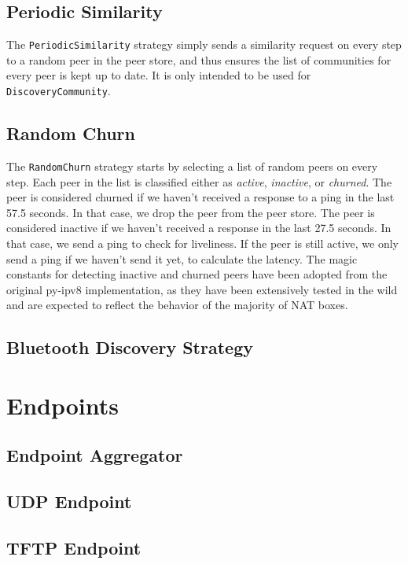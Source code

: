\subsection{Periodic Similarity}

The \texttt{PeriodicSimilarity} strategy simply sends a similarity request on every step to a random peer in the peer store, and thus ensures the list of communities for every peer is kept up to date. It is only intended to be used for \texttt{DiscoveryCommunity}.

\subsection{Random Churn}

The \texttt{RandomChurn} strategy starts by selecting a list of random peers on every step. Each peer in the list is classified either as \textit{active}, \textit{inactive}, or \textit{churned}. The peer is considered churned if we haven't received a response to a ping in the last 57.5 seconds. In that case, we drop the peer from the peer store. The peer is considered inactive if we haven't received a response in the last 27.5 seconds. In that case, we send a ping to check for liveliness. If the peer is still active, we only send a ping if we haven't send it yet, to calculate the latency. The magic constants for detecting inactive and churned peers have been adopted from the original py-ipv8 implementation, as they have been extensively tested in the wild and are expected to reflect the behavior of the majority of NAT boxes. \cite{nat_wild}

\subsection{Bluetooth Discovery Strategy}

\section{Endpoints}

\subsection{Endpoint Aggregator}

\subsection{UDP Endpoint}

\subsection{TFTP Endpoint}

